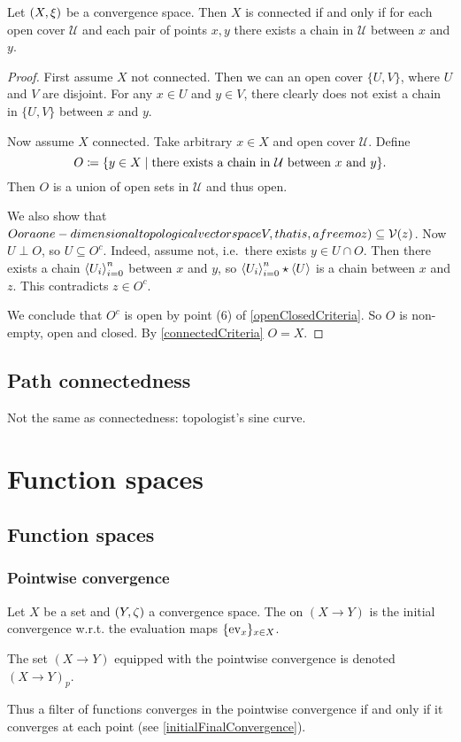 \begin{proposition}
Let $\left( X,\xi \right)$ be a convergence space. Then $X$ is connected \textup{if and only if} for each open cover $\mathcal{U}$ and each pair of points $x,y$ there exists a chain in $\mathcal{U}$ between $x$ and $y$.
\end{proposition}
\begin{proof}
First assume $X$ not connected. Then we can an open cover $\{U,V\}$, where $U$ and $V$ are disjoint. For any $x\in U$ and $y\in V$, there clearly does not exist a chain in $\{U,V\}$ between $x$ and $y$.

Now assume $X$ connected. Take arbitrary $x\in X$ and open cover $\mathcal{U}$. Define
\[ O \defeq \setbuilder{y\in X}{\text{there exists a chain in $\mathcal{U}$ between $x$ and $y$}}. \]
Then $O$ is a union of open sets in $\mathcal{U}$ and thus open.

We also show that $Oor a one-dimensional topological vectorspace V , that is, a free moz)\subseteq \operatorname{\mathcal{V}}(z)$. Now $U\perp O$, so $U\subseteq O^c$. Indeed, assume not, i.e.\ there exists $y\in U\cap O$. Then there exists a chain $\left\langle U_{i} \right\rangle_{i=0}^n$ between $x$ and $y$, so $\left\langle U_{i} \right\rangle_{i=0}^n\star\left\langle U \right\rangle$ is a chain between $x$ and $z$. This contradicts $z\in O^c$.

We conclude that $O^c$ is open by point (6) of \ref{openClosedCriteria}. So $O$ is non-empty, open and closed. By \ref{connectedCriteria} $O = X$.
\end{proof}


\section{Path connectedness}
\begin{example}
Not the same as connectedness: topologist's sine curve. 
\end{example}


\chapter{Function spaces}
\section{Function spaces}
\subsection{Pointwise convergence}
\begin{definition}
Let $X$ be a set and $\left( Y,\zeta \right)$ a convergence space. The  on $(X\to Y)$ is the initial convergence w.r.t. the evaluation maps $\{\operatorname{ev}_x\}_{x\in X}$.

The set $(X\to Y)$ equipped with the pointwise convergence is denoted $(X\to Y)_p$.
\end{definition}
Thus a filter of functions converges in the pointwise convergence if and only if it converges at each point (see \ref{initialFinalConvergence}).

